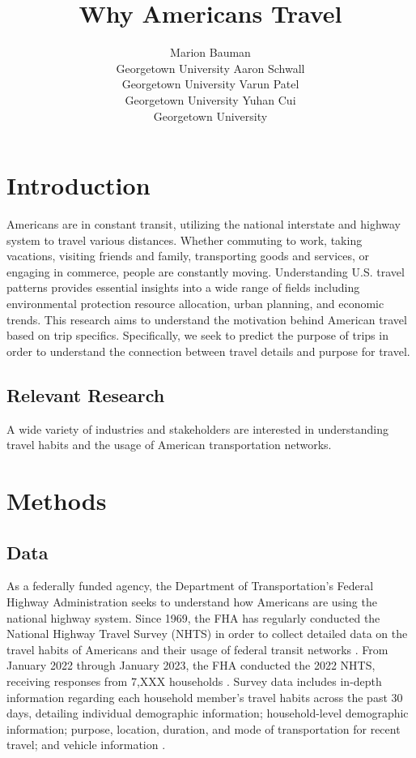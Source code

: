 \documentclass[
  article,
  nofooter]{jss}
\author{Marion Bauman\\Georgetown University \And Aaron
Schwall\\Georgetown University \AND Varun Patel\\Georgetown
University \And Yuhan Cui\\Georgetown University}
\title{Why Americans Travel}
\begin{document}
\maketitle

\section{Introduction}\label{introduction}

Americans are in constant transit, utilizing the national interstate and
highway system to travel various distances. Whether commuting to work,
taking vacations, visiting friends and family, transporting goods and
services, or engaging in commerce, people are constantly moving.
Understanding U.S. travel patterns provides essential insights into a
wide range of fields including environmental protection resource
allocation, urban planning, and economic trends. This research aims to
understand the motivation behind American travel based on trip
specifics. Specifically, we seek to predict the purpose of trips in
order to understand the connection between travel details and purpose
for travel.

\subsection{Relevant Research}\label{relevant-research}

A wide variety of industries and stakeholders are interested in
understanding travel habits and the usage of American transportation
networks.

\subsection{}\label{section}

\section{Methods}\label{methods}

\subsection{Data}\label{data}

As a federally funded agency, the Department of Transportation's Federal
Highway Administration seeks to understand how Americans are using the
national highway system. Since 1969, the FHA has regularly conducted the
National Highway Travel Survey (NHTS) in order to collect detailed data
on the travel habits of Americans and their usage of federal transit
networks \citep{userguide}. From January 2022 through January 2023, the
FHA conducted the 2022 NHTS, receiving responses from 7,XXX households
\citep{website}. Survey data includes in-depth information regarding
each household member's travel habits across the past 30 days, detailing
individual demographic information; household-level demographic
information; purpose, location, duration, and mode of transportation for
recent travel; and vehicle information \citep{datadictionary}.
\end{document}
